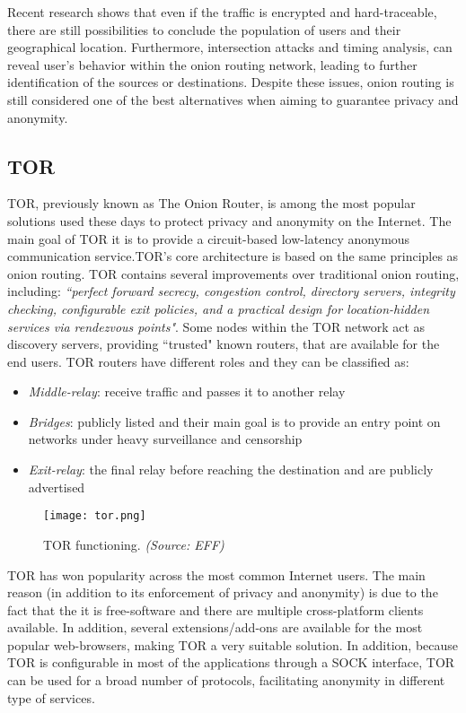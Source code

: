 \documentclass[conference]{IEEEtran}
\begin{document}
Recent research\cite{SWARM} shows that even if the traffic is encrypted and hard-traceable, there are still possibilities to conclude the population of users and their geographical location. Furthermore, intersection attacks and timing analysis\cite{timing}, can reveal user's behavior within the onion routing network, leading to further identification of the sources or destinations. Despite these issues, onion routing is still considered one of the best alternatives when aiming to guarantee privacy and anonymity.

\subsection{TOR}

TOR, previously known as The Onion Router\cite{TOR}, is among the most popular solutions used these days to protect privacy and anonymity on the Internet. The main goal of TOR it is to provide a circuit-based low-latency anonymous communication service\cite{TOR}.TOR's core architecture is based on the same principles as onion routing. TOR contains several improvements over traditional onion routing, including: \textit{``perfect forward secrecy, congestion control, directory servers, integrity checking, configurable exit policies, and a practical design for location-hidden services via rendezvous points"}\cite{TOR}. Some nodes within the TOR network act as discovery servers, providing ``trusted" known routers, that are available for the end users. TOR routers have different roles and they can be classified as:

\begin{itemize}
\item {\textit{Middle-relay}: receive traffic and passes it to another relay}
\item {\textit{Bridges}: publicly listed and their main goal is to provide an entry point on networks under heavy surveillance and censorship}
\item {\textit{Exit-relay}: the final relay before reaching the destination and are publicly advertised}
\end{itemize}

\begin{figure}[h]
  \centering
  \captionsetup{justification=centering}
  \texttt{[image: tor.png]}
  \caption{TOR functioning. \textit{(Source: EFF)}}
\end{figure}

TOR has won popularity across the most common Internet users. The main reason (in addition to its enforcement of privacy and anonymity) is due to the fact that the it is free-software and there are multiple cross-platform clients available. In addition, several extensions/add-ons are available for the most popular web-browsers, making TOR a very suitable solution. In addition, because TOR is configurable in most of the applications through a SOCK interface, TOR can be used for a broad number of protocols, facilitating anonymity in different type of services\cite{TOR}.
\end{document}

